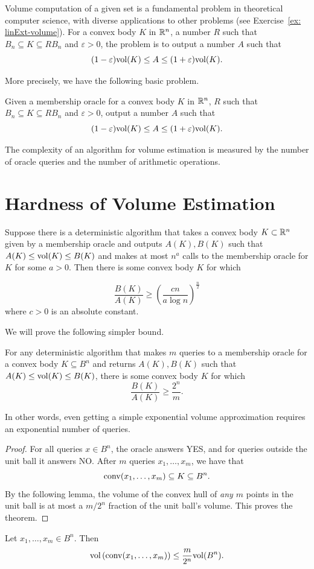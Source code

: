 %
Volume computation of a given set is a fundamental problem in theoretical
computer science, with diverse applications to other problems (see
Exercise~\ref{ex: linExt-volume}). For a convex body $K$ in $\mathbb{R}^{n}$,
a number $R$ such that $B_{n}\subseteq K\subseteq RB_{n}$ and $\varepsilon>0$,
the problem is to output a number $A$ such that 
\[
(1-\varepsilon)\mathrm{vol}(K)\le A\le(1+\varepsilon)\mathrm{vol}(K).
\]

More precisely, we have the following basic problem. 
\begin{problem}
\label{problem:volume} Given a membership oracle for a convex body
$K$ in $\mathbb{R}^{n}$, $R$ such that $B_{n}\subseteq K\subseteq RB_{n}$
and $\varepsilon>0$, output a number $A$ such that 
\[
(1-\varepsilon)\mathrm{vol}(K)\le A\le(1+\varepsilon)\mathrm{vol}(K).
\]

The complexity of an algorithm for volume estimation is measured by
the number of oracle queries and the number of arithmetic operations. 
\end{problem}


\section{Hardness of Volume Estimation}
\begin{thm}
\cite{BF87,BF88} Suppose there is a deterministic algorithm that
takes a convex body $K\subset\mathbb{R}^{n}$ given by a membership oracle
and outputs $A(K),B(K)$ such that $A(K)\le\mathrm{vol}(K)\le B(K)$ and makes
at most $n^{a}$ calls to the membership oracle for $K$ for some
$a>0$. Then there is some convex body $K$ for which

\[
\frac{B(K)}{A(K)}\ge\left(\frac{cn}{a\log n}\right)^{\frac{n}{2}}
\]
where $c>0$ is an absolute constant.
\end{thm}

We will prove the following simpler bound.
\begin{thm}
\cite{E86} For any deterministic algorithm that makes $m$ queries
to a membership oracle for a convex body $K\subseteq B^{n}$ and returns
$A(K),B(K)$ such that $A(K)\le\mathrm{vol}(K)\le B(K)$, there is some convex
body $K$ for which 
\[
\frac{B(K)}{A(K)}\ge\frac{2^{n}}{m}.
\]
\end{thm}

In other words, even getting a simple exponential volume approximation
requires an exponential number of queries. 
\begin{proof}
For all queries $x\in B^{n}$, the oracle answers YES, and for queries
outside the unit ball it answers NO. After $m$ queries $x_{1},\ldots,x_{m}$,
we have that 
\[
\mathrm{conv}(x_{1},\ldots,x_{m})\subseteq K\subseteq B^{n}.
\]
By the following lemma, the volume of the convex hull of \emph{any
$m$ }points in the unit ball is at most a $m/2^{n}$ fraction of
the unit ball's volume. This proves the theorem.
\end{proof}
\begin{lem}
Let $x_{1},\ldots,x_{m}\in B^{n}$. Then 
\[
\mathrm{vol}\left(\mathrm{conv}(x_{1},\ldots,x_{m})\right)\le\frac{m}{2^{n}}\mathrm{vol}(B^{n}).
\]
\end{lem}

